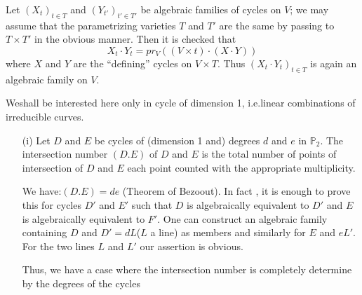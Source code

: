 {Let $(X_t)_{t \in T}$ and  $(Y_{t'})_{t' \in T'}$ be algebraic
families of cycles on $V$; we may assume that the parametrizing
varieties $T$ and $T'$ are the same by passing  to $T \times T'$ in
the obvious manner. Then it is checked that 
$$
X_t\cdot Y_t=pr_V((V \times t)\cdot (X\cdot Y))
$$
where $X$ and $Y$ are the ``defining'' cycles on $V \times T$. Thus
$(X_t\cdot Y_t)_{t \in T}$ is again an algebraic family on $V$. 

\begin{examples*}%
  We\pageoriginale shall be interested here only in cycle of dimension 1,  i.e.linear
  combinations of irreducible curves. 
  \begin{enumerate}
  \item[(i)] Let $D$ and $E$ be cycles of (dimension 1 and) degrees
    $d$ and $e$ in $\mathbb{P}_2$. The intersection number $(D.E)$ of
    $D$ and $E$ is the total number of points of intersection of $D$ and
    $E$  each  point counted with the appropriate multiplicity. 
    
    We have:$(D.E)=de$ (Theorem of Bezoout). In fact , it is enough to
    prove this for cycles $D'$ and $E'$ such that $D$ is  algebraically
    equivalent to $D'$ and $E$ is algebraically equivalent to $F'$. One
    can construct an algebraic family containing $D$ and $D'=dL$($L$ a
    line) as members and similarly for $E$ and $eL'$. For the two lines
    $L$ and $L'$ our assertion is obvious. 
    
    Thus, we have a case where the intersection  number is completely
    determine  by the degrees of the  cycles 
    

\end{enumerate}
\end{examples*}}
